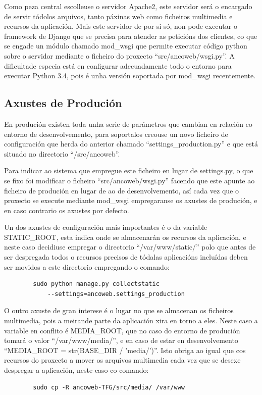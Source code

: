         Como peza central escolleuse o servidor Apache2, este servidor será o encargado de servir 
        tódolos arquivos, tanto páxinas web como ficheiros multimedia e recursos da aplicación. Mais
        este servidor de por si só, non pode executar o framework de Django que se precisa para 
        atender as peticións dos clientes, co que se engade un módulo chamado mod\_wsgi
        que permite executar código python sobre o servidor mediante o ficheiro do proxecto
        ``src/ancoweb/wsgi.py''. A dificultade especia está en configurar adecuadamente todo o entorno
        para executar Python 3.4, pois é unha versión soportada por mod\_wsgi recentemente.
        
    \subsection{Axustes de Produción}
        En produción existen toda unha serie de parámetros que cambian en relación co entorno de 
        desenvolvemento, para soportalos creouse un novo ficheiro de configuración que herda do 
        anterior chamado ``settings\_production.py'' e que está situado no directorio 
        ``/src/ancoweb''.
        
        Para indicar ao sistema que empregue este ficheiro en lugar de settings.py, o que se fixo 
        foi modificar o ficheiro ``src/ancoweb/wsgi.py'' facendo que este apunte ao ficheiro de 
        produción en lugar de ao de desenvolvemento, así cada vez que o proxecto se execute mediante
        mod\_wsgi empregaranse os axustes de produción, e en caso contrario os axustes por defecto.
        
        Un dos axustes de configuración mais importantes é o da variable STATIC\_ROOT, esta indica
        onde se almacenarán os recursos da aplicación, e neste caso decidiuse empregar o directorio
        ``/var/www/static/'' polo que antes de ser despregada todos o recursos precisos de tódalas 
        aplicacións incluídas deben ser movidos a este directorio empregando o comando:
        
        \begin{verbatim}
        sudo python manage.py collectstatic 
            --settings=ancoweb.settings_production
        \end{verbatim}

        O outro axuste de gran interese é o lugar no que se almacenan os ficheiros multimedia, pois
        a meirande parte da aplicación xira en torno a eles. Neste caso a variable en conflito é 
        MEDIA\_ROOT, que no caso do entorno de produción tomará o valor ``/var/www/media/'', e en 
        caso de estar en desenvolvemento ``MEDIA\_ROOT = str(BASE\_DIR / 'media/')''. Isto obriga ao 
        igual que cos recursos do proxecto a mover os arquivos multimedia cada vez que se desexe 
        despregar a aplicación, neste caso co comando:
        
        \begin{verbatim}
        sudo cp -R ancoweb-TFG/src/media/ /var/www
        \end{verbatim}

    
    
    
    
    
    
    
    
